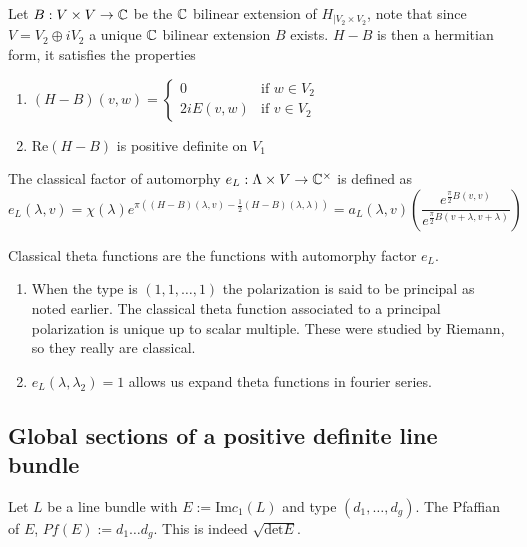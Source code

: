 \begin{paragraph}
{}Let $B:V\times V\rightarrow {\mathbb C}$ be the ${\mathbb C}$ bilinear extension of $H_{\mid V_2\times V_2}$, note that since $V=V_2\oplus i V_2$ a unique ${\mathbb C}$ bilinear extension $B$ exists. $H-B$ is then a hermitian form, it satisfies the properties 
\begin{enumerate}
\item $(H-B)(v,w)=\begin{cases}
0 &\mbox{if } w\in V_2\\
2i E(v,w) &\mbox{if } v\in V_2
\end{cases}$
\item $\text{Re}(H-B)$ is positive definite on $V_1$
\end{enumerate}
\begin{definition}
The classical factor of automorphy $e_L:\Lambda\times V\rightarrow {\mathbb C}^{\times}$ is defined as
\begin{equation*}
e_L(\lambda, v)=\chi(\lambda) e^{\pi((H-B)(\lambda,v)-\frac{1}{2} (H-B)(\lambda, \lambda))}=a_L(\lambda,v) (\frac{e^{\frac{\pi}{2} B(v,v)}}{e^{\frac{\pi}{2} B(v+\lambda,v+\lambda)}})
\end{equation*}
\end{definition}
\begin{definition}
Classical theta functions are the functions with automorphy factor $e_L$.
\end{definition}
\begin{enumerate}
\item When the type is $(1,1,\dots, 1)$ the polarization is said to be principal as noted earlier. The classical theta function associated to a principal polarization is unique up to scalar multiple. These were studied by Riemann, so they really are classical.
\item $e_L(\lambda, \lambda_2)=1$ allows us expand theta functions in fourier series.
\end{enumerate}

\subsection{Global sections of a positive definite line bundle}
\begin{definition}
Let $L$ be a line bundle with $E:=\text{Im} c_1(L)$ and type $(d_1,\dots, d_g)$. The Pfaffian of $E$, $Pf(E):=d_1\dots d_g$. This is indeed $\sqrt{\text{det} E}$.
\end{definition}
\end{paragraph}

